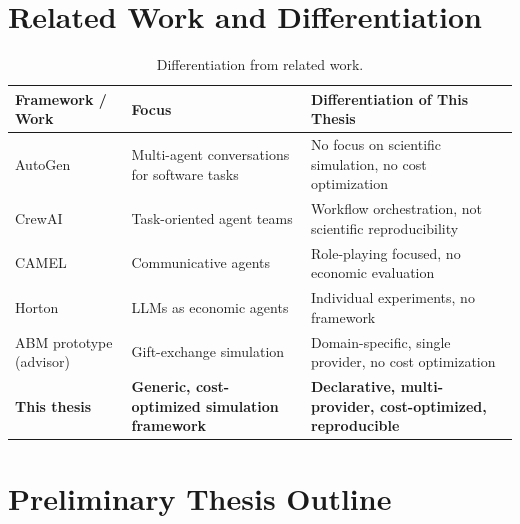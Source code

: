 \documentclass[12pt, a4paper]{article}
\begin{document}
\section{Related Work and Differentiation}

\begin{table}[h!]
    \centering
    \small
    \begin{tabularx}{\textwidth}{lp{3.5cm}X}
        \toprule
        \textbf{Framework / Work} & \textbf{Focus} & \textbf{Differentiation of This Thesis} \\
        \midrule
        AutoGen~\cite{wu2023}
            & Multi-agent conversations for software tasks
            & No focus on scientific simulation, no cost optimization \\
        CrewAI
            & Task-oriented agent teams
            & Workflow orchestration, not scientific reproducibility \\
        CAMEL~\cite{li2023}
            & Communicative agents
            & Role-playing focused, no economic evaluation \\
        Horton~\cite{horton2023}
            & LLMs as economic agents
            & Individual experiments, no framework \\
        ABM prototype (advisor)
            & Gift-exchange simulation
            & Domain-specific, single provider, no cost optimization \\
        \midrule
        \textbf{This thesis}
            & \textbf{Generic, cost-optimized simulation framework}
            & \textbf{Declarative, multi-provider, cost-optimized, reproducible} \\
        \bottomrule
    \end{tabularx}
    \caption{Differentiation from related work.}
    \label{tab:related}
\end{table}

\section{Preliminary Thesis Outline}
\end{document}
